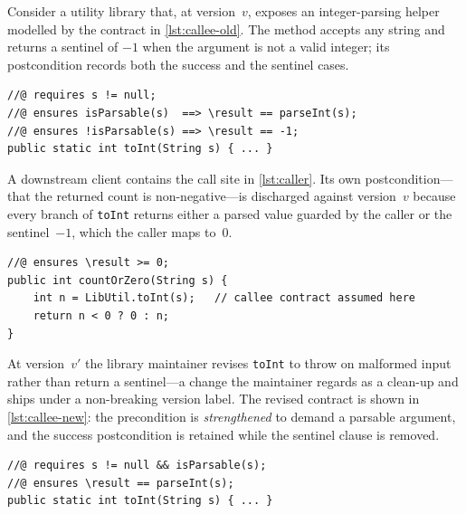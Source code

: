 Consider a utility library that, at version~$v$, exposes an integer-parsing
helper modelled by the contract in \cref{lst:callee-old}. The method accepts any
string and returns a sentinel of $-1$ when the argument is not a valid integer;
its postcondition records both the success and the sentinel cases.

\begin{lstlisting}[caption={Library method \texttt{toInt} at version~$v$ (callee contract).},label={lst:callee-old}]
//@ requires s != null;
//@ ensures isParsable(s)  ==> \result == parseInt(s);
//@ ensures !isParsable(s) ==> \result == -1;
public static int toInt(String s) { ... }
\end{lstlisting}

A downstream client contains the call site in \cref{lst:caller}. Its own
postcondition---that the returned count is non-negative---is discharged against
version~$v$ because every branch of \texttt{toInt} returns either a parsed value
guarded by the caller or the sentinel~$-1$, which the caller maps to~$0$.

\begin{lstlisting}[caption={Client call site relying on the version-$v$ contract.},label={lst:caller}]
//@ ensures \result >= 0;
public int countOrZero(String s) {
    int n = LibUtil.toInt(s);   // callee contract assumed here
    return n < 0 ? 0 : n;
}
\end{lstlisting}

At version~$v'$ the library maintainer revises \texttt{toInt} to throw on
malformed input rather than return a sentinel---a change the maintainer regards
as a clean-up and ships under a non-breaking version label. The revised contract
is shown in \cref{lst:callee-new}: the precondition is \emph{strengthened} to
demand a parsable argument, and the success postcondition is retained while the
sentinel clause is removed.

\begin{lstlisting}[caption={Library method \texttt{toInt} at version~$v'$ (strengthened precondition).},label={lst:callee-new}]
//@ requires s != null && isParsable(s);
//@ ensures \result == parseInt(s);
public static int toInt(String s) { ... }
\end{lstlisting}

